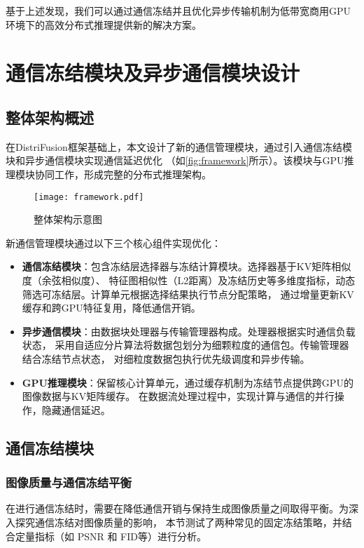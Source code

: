 基于上述发现，我们可以通过通信冻结并且优化异步传输机制为低带宽商用GPU环境下的高效分布式推理提供新的解决方案\cite{Liu2021AutoFreezeAF}。

\section{通信冻结模块及异步通信模块设计}
\label{sec:communication_freeze_and_async_communication_module_design}
\subsection{整体架构概述}
在DistriFusion框架基础上，本文设计了新的通信管理模块，通过引入通信冻结模块和异步通信模块实现通信延迟优化
（如\autoref{fig:framework}所示）。该模块与GPU推理模块协同工作，形成完整的分布式推理架构。

\begin{figure}[ht]
    \centering
    \texttt{[image: framework.pdf]}
    \caption{整体架构示意图}
    \label{fig:framework}
\end{figure}

\par
新通信管理模块通过以下三个核心组件实现优化：
\begin{itemize}
    \item \textbf{通信冻结模块}：包含冻结层选择器与冻结计算模块。选择器基于KV矩阵相似度（余弦相似度）、
    特征图相似性（L2距离）及冻结历史等多维度指标，动态筛选可冻结层。计算单元根据选择结果执行节点分配策略，
    通过增量更新KV缓存和跨GPU特征复用，降低通信开销。
    \item \textbf{异步通信模块}：由数据块处理器与传输管理器构成。处理器根据实时通信负载状态，
    采用自适应分片算法将数据包划分为细颗粒度的通信包。传输管理器结合冻结节点状态，
    对细粒度数据包执行优先级调度和异步传输。
    \item \textbf{GPU推理模块}：保留核心计算单元，通过缓存机制为冻结节点提供跨GPU的图像数据与KV矩阵缓存。
    在数据流处理过程中，实现计算与通信的并行操作，隐藏通信延迟。
\end{itemize}

\subsection{通信冻结模块}
\label{subsubsec:通信冻结模块}
\subsubsection{图像质量与通信冻结平衡}
\label{subsubsec:图像质量与通信冻结平衡}
在进行通信冻结时，需要在降低通信开销与保持生成图像质量之间取得平衡。为深入探究通信冻结对图像质量的影响，
本节测试了两种常见的固定冻结策略，并结合定量指标（如 PSNR 和 FID等）进行分析。

